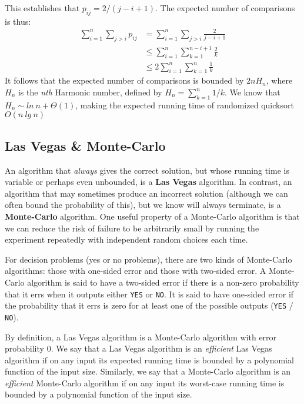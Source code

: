 This establishes that $p_{ij} = 2/(j - i + 1)$. The expected number of comparisons is thus:
%
\begin{align*}
	\sum_{i=1}^n \sum_{j>i} p_{ij} &= \sum_{i=1}^n \sum_{j>i} \frac{2}{j-i+1} \\
	&\leq \sum_{i=1}^n \sum_{k=1}^{n-i+1} \frac{2}{k} \\
	&\leq 2\sum_{i=1}^n \sum_{k=1}^{n} \frac{1}{k}
\end{align*}
%
It follows that the expected number of comparisons is bounded by $2nH_n$, where $H_n$ is the \textit{nth}
Harmonic number, defined by $H_n = \sum_{k=1}^n 1/k$. We know that $H_n \sim ln\ n + \Theta(1)$, making the
expected running time of randomized quicksort $O(n\ lg\ n)$

\subsection{Las Vegas \& Monte-Carlo}
An algorithm that \textit{always} gives the correct solution, but whose running time is variable or perhaps even
unbounded, is a \textbf{Las Vegas} algorithm. In contrast, an algorithm that may sometimes produce an incorrect
solution (although we can often bound the probability of this), but we know will always terminate, is a
\textbf{Monte-Carlo} algorithm. One useful property of a Monte-Carlo algorithm is that we can reduce the risk of
failure to be arbitrarily small by running the experiment repeatedly with independent random choices each time.

For decision problems (yes or no problems), there are two kinds of Monte-Carlo
algorithms: those with one-sided error and those with two-sided error. A
Monte-Carlo algorithm is said to have a two-sided error if there is a non-zero
probability that it errs when it outputs either \texttt{YES} or \texttt{NO}. It is said
to have one-sided error if the probability that it errs is zero for at least one of the
possible outputs (\texttt{YES} / \texttt{NO}).

By definition, a Las Vegas algorithm is a Monte-Carlo algorithm with error
probability $0$. We say that a Las Vegas algorithm is an \textit{efficient}
Las Vegas algorithm if on any input its expected running time is bounded by a
polynomial function of the input size. Similarly, we say that a Monte-Carlo algorithm
is an \textit{efficient} Monte-Carlo algorithm if on any input its worst-case running
time is bounded by a polynomial function of the input size.
